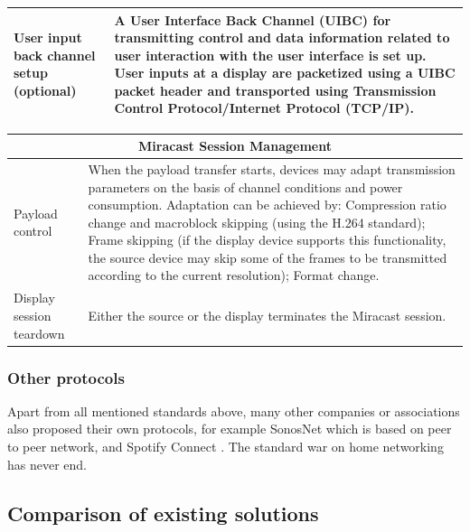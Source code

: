 \begin{center}
\begin{tabular}{ | p{3.5cm} | p{10cm} |}
    User input back channel setup (optional) & A User Interface Back Channel 
    (UIBC) for transmitting control and data information related to user 
    interaction with the user interface is set up. User inputs at a display are 
    packetized using a UIBC packet header and transported using Transmission 
    Control Protocol/Internet Protocol (TCP/IP).\\ \hline 
    \end{tabular} 
\end{center} 

\begin{center} 
    \begin{tabular}{ | p{3.5cm} | p{10cm} |} 
     \hline 
    \multicolumn{2}{c}{Miracast Session Management}\\ 
    \hline 
    Payload control & When the payload transfer starts, devices may adapt 
    transmission parameters on the basis of channel conditions and power 
    consumption. Adaptation can be achieved by: Compression ratio change and 
    macroblock skipping (using the H.264 standard); Frame skipping (if the 
    display device supports this functionality, the source device may skip some 
    of the frames to be transmitted according to the current resolution); 
    Format change. \\ \hline 
    
    Display session teardown  & Either the source or the display terminates the 
    Miracast session. \\ \hline 
    \end{tabular} 
\end{center} 

\subsubsection{Other protocols} 
Apart from all mentioned standards above, many other companies or associations 
also proposed their own protocols, for example SonosNet \cite{sonosnet} which is 
based on peer to peer network, and Spotify Connect \cite{spotifyconnect}. The 
standard war on home networking has never end. 

\subsection{Comparison of existing solutions} 
